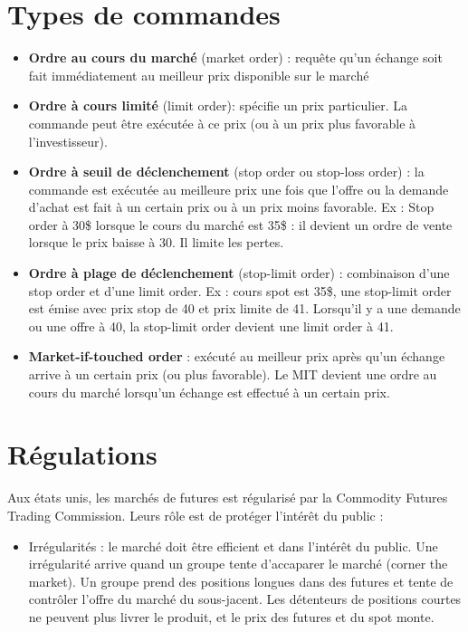\section{Types de commandes}

\begin{itemize}
	\item \textbf{Ordre au cours du marché} (market order) : requête qu'un échange soit fait immédiatement au meilleur prix disponible sur le marché 
	\item \textbf{Ordre à cours limité} (limit order): spécifie un prix particulier. La commande peut être exécutée à ce prix (ou à un prix plus favorable à l'investisseur). 
	\item \textbf{Ordre à seuil de déclenchement} (stop order ou stop-loss order) : la commande est exécutée au meilleure prix une fois que l'offre ou la demande d'achat est fait à un certain prix ou à un prix moins favorable. Ex : Stop order à 30\$ lorsque le cours du marché est 35\$ : il devient un ordre de vente lorsque le prix baisse à 30. Il limite les pertes. 
	\item \textbf{Ordre à plage de déclenchement} (stop-limit order) : combinaison d'une stop order et d'une limit order. Ex : cours spot est 35\$, une stop-limit order est émise avec prix stop de 40 et prix limite de 41. Lorsqu'il y a une demande ou une offre à 40, la stop-limit order devient une limit order à 41. 
	\item \textbf{Market-if-touched order} : exécuté au meilleur prix après qu'un échange arrive à un certain prix (ou plus favorable). Le MIT devient une ordre au cours du marché lorsqu'un échange est effectué à un certain prix. 
\end{itemize}

\section{Régulations}

Aux états unis, les marchés de futures est régularisé par la Commodity Futures Trading Commission. Leurs rôle est de protéger l'intérêt du public : 

\begin{itemize}
	\item Irrégularités : le marché doit être efficient et dans l'intérêt du public. Une irrégularité arrive quand un groupe tente d'accaparer le marché (corner the market). Un groupe prend des positions longues dans des futures et tente de contrôler l'offre du marché du sous-jacent. Les détenteurs de positions courtes ne peuvent plus livrer le produit, et le prix des futures et du spot monte. 
\end{itemize}

